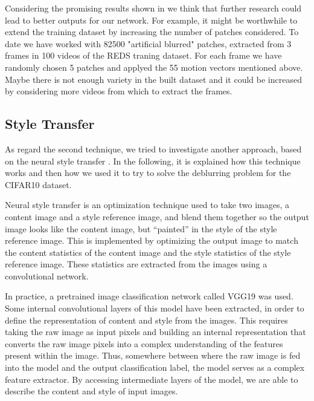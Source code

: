 \documentclass[12pt,a4paper]{article}
\begin{document}
Considering the promising results shown in \cite{S&Al} we think that further research could lead to better outputs for our network. For example, it might be worthwhile to extend the training dataset by increasing the number of patches considered. To date we have worked with 82500 "artificial blurred" patches, extracted from 3 frames in 100 videos of the REDS traning dataset. For each frame we have randomly chosen 5 patches and applyed the 55 motion vectors mentioned above. Maybe there is not enough variety in the built dataset and it could be increased by considering more videos from which to extract the frames. 

\subsection{Style Transfer}
As regard the second technique, we tried to investigate another approach, based on the neural style transfer \cite{G&E&B} \cite{Site}. In the following, it is explained how this technique works and then how we used it to try to solve the deblurring problem for the CIFAR10 dataset.

Neural style transfer is an optimization technique used to take two images, a content image and a style reference image, and blend them together so the output image looks like the content image, but “painted” in the style of the style reference image.
This is implemented by optimizing the output image to match the content statistics of the content image and the style statistics of the style reference image. These statistics are extracted from the images using a convolutional network.

In practice, a pretrained image classification network called VGG19 was used. Some internal convolutional layers of this model have been extracted, in order to define the representation of content and style from the images. This requires taking the raw image as input pixels and building an internal representation that converts the raw image pixels into a complex understanding of the features present within the image. Thus, somewhere between where the raw image is fed into the model and the output classification label, the model serves as a complex feature extractor. By accessing intermediate layers of the model, we are able to describe the content and style of input images.
\end{document}
